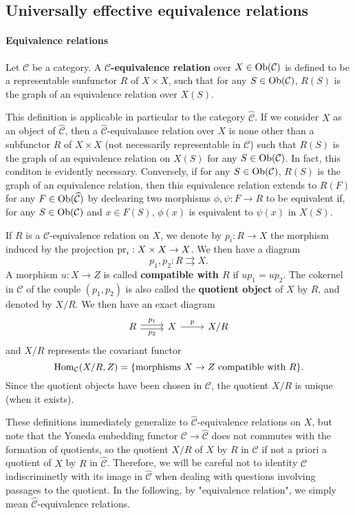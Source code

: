 \subsection{Universally effective equivalence relations}
\paragraph{Equivalence relations}
\begin{definition}
Let $\mathcal{C}$ be a category. A \textbf{$\mathcal{C}$-equivalence relation} over $X\in\mathrm{Ob}(\mathcal{C})$ is defined to be a representable sunfunctor $R$ of $X\times X$, such that for any $S\in\mathrm{Ob}(\mathcal{C})$, $R(S)$ is the graph of an equivalence relation over $X(S)$.
\end{definition}
This definition is applicable in particular to the category $\widehat{\mathcal{C}}$. If we consider $X$ as an object of $\widehat{\mathcal{C}}$, then a $\widehat{\mathcal{C}}$-equivalance relation over $X$ is none other than a subfunctor $R$ of $X\times X$ (not necessarily representable in $\mathcal{C}$) such that $R(S)$ is the graph of an equivalence relation on $X(S)$ for any $S\in\mathrm{Ob}(\mathcal{C})$. In fact, this conditon is evidently necessary. Conversely, if for any $S\in\mathrm{Ob}(\mathcal{C})$, $R(S)$ is the graph of an equivalence relation, then this equivalence relation extends to $R(F)$ for any $F\in\mathrm{Ob}(\widehat{\mathcal{C}})$ by declearing two morphisms $\phi,\psi:F\to R$ to be equivalent if, for any $S\in\mathrm{Ob}(\mathcal{C})$ and $x\in F(S)$, $\phi(x)$ is equivalent to $\psi(x)$ in $X(S)$.\par
If $R$ is a $\mathcal{C}$-equivalence relation on $X$, we denote by $p_i:R\to X$ the morphism induced by the projection $\mathrm{pr}_i:X\times X\to X$. We then have a diagram
\[p_1,p_2:R\rightrightarrows X.\]
A morphism $u:X\to Z$ is called \textbf{compatible with $R$} if $up_1=up_2$. The cokernel in $\mathcal{C}$ of the couple $(p_1,p_2)$ is also called the \textbf{quotient object} of $X$ by $R$, and denoted by $X/R$. We then have an exact diagram
\[\begin{tikzcd}
R\ar[r,shift left=2pt,"p_1"]\ar[r,shift right=2pt,swap,"p_2"]&X\ar[r,"p"]&X/R
\end{tikzcd}\]
and $X/R$ represents the covariant functor
\[\mathrm{Hom}_{\mathcal{C}}(X/R,Z)=\{\text{morphisms $X\to Z$ compatible with $R$}\}.\]
Since the quotient objects have been chosen in $\mathcal{C}$, the quotient $X/R$ is unique (when it exists).\par
These definitions immediately generalize to $\widehat{\mathcal{C}}$-equivalence relations on $X$, but note that the Yoneda embedding functor $\mathcal{C}\to\widehat{\mathcal{C}}$ does not commutes with the formation of quotients, so the quotient $X/R$ of $X$ by $R$ in $\mathcal{C}$ if not a priori a quotient of $X$ by $R$ in $\widehat{\mathcal{C}}$. Therefore, we will be careful not to identity $\mathcal{C}$ indiscriminetly with its image in $\widehat{\mathcal{C}}$ when dealing with questions involving passages to the quotient. In the following, by "equivalence relation", we simply mean $\widehat{\mathcal{C}}$-equivalence relations.\par

